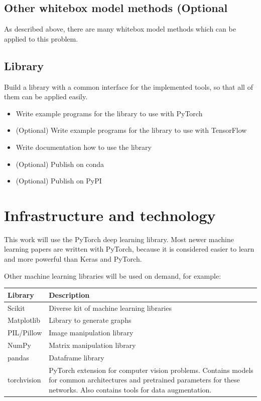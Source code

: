 \subsection{Other whitebox model methods (Optional}
As described above, there are many whitebox model methods which can be applied to this problem.

\subsection{Library}
Build a library with a common interface for the implemented tools, so that all of them can be applied easily.
\begin{itemize}
    \item Write example programs for the library to use with PyTorch
    \item (Optional) Write example programs for the library to use with TensorFlow
    \item Write documentation how to use the library
    \item (Optional) Publish on conda
    \item (Optional) Publish on PyPI
    
\end{itemize}

\section{Infrastructure and technology}
This work will use the PyTorch\cite{paszke2017automatic} deep learning library. Most newer machine learning papers are written with PyTorch, because it is considered easier to learn and more powerful than Keras and PyTorch\cite{pytorchvstensorflow}.

Other machine learning libraries will be used on demand, for example:

\begin{tabular}{|p{3cm}|p{12.5cm}|}
    \hline
    \textbf{Library} & \textbf{Description} \\ \hline
    Scikit & Diverse kit of machine learning libraries \\ \hline
    Matplotlib & Library to generate graphs \\ \hline
    PIL/Pillow & Image manipulation library \\ \hline
    NumPy & Matrix manipulation library \\ \hline
    pandas & Dataframe library \\ \hline
    torchvision & PyTorch extension for computer vision problems. Contains models for common architectures and pretrained parameters for these networks. Also contains tools for data augmentation. \\ \hline
\end{tabular}

